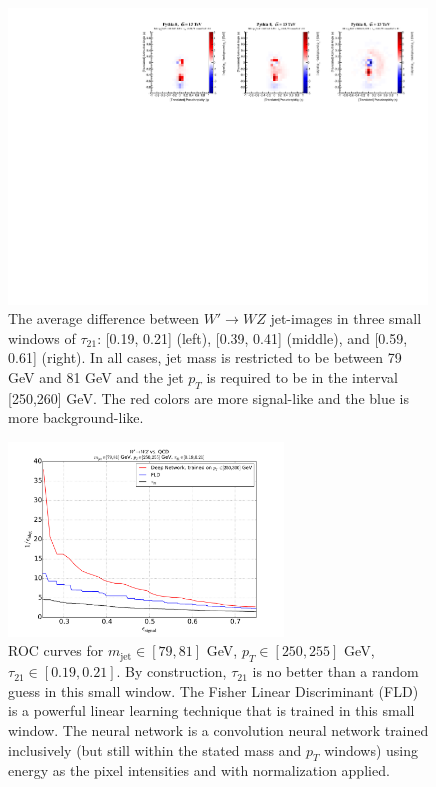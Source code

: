 \begin{figure}[h!]
  \begin{center}
  
        \includegraphics[width=0.99\textwidth]{figures/difference_fixed_nonorm.pdf}
        
      \caption{
         The average difference between $W'\rightarrow WZ$ jet-images in three small windows of $\tau_{21}$: [0.19, 0.21] (left), [0.39, 0.41] (middle), and [0.59, 0.61] (right).  In all cases, jet mass is restricted to be between 79 GeV and 81 GeV and the jet $p_T$ is required to be in the interval [250,260] GeV.  The red colors are more signal-like and the blue is more background-like.
        \label{fig:meanImagesWindow2} 
      }
    \end{center}
\end{figure}  

\begin{figure}[h!]
  \centering
  \includegraphics[width=0.65\textwidth]{figures/augwindow-roc.pdf}
  \caption{ROC curves for $m_\text{jet}\in [79, 81]$ GeV, $p_{T}\in [250, 255]$ GeV, $\tau_{21}\in[0.19, 0.21]$. By construction, $\tau_{21}$ is no better than a random guess in this small window.  The Fisher Linear Discriminant (FLD) is a powerful linear learning technique that is trained in this small window.  The neural network is a convolution neural network trained inclusively (but still within the stated mass and $p_T$ windows) using energy as the pixel intensities and with normalization applied.}
  \label{fig:rocWindow}
\end{figure}

